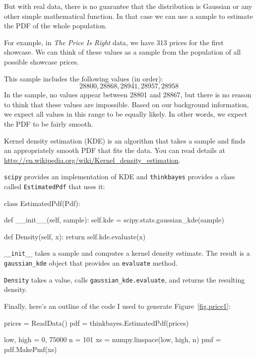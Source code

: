 \documentclass[12pt]{book}
\theoremstyle{exercise}
\begin{document}
But with real data, there is no guarantee that the distribution
is Gaussian or any other simple mathematical function.  In
that case we can use a sample to estimate the PDF of
the whole population.

For example, in {\it The Price Is Right} data, we have
313 prices for the first showcase.  We can think of these
values as a sample from the population of all possible showcase
prices.

This sample includes the following values (in order):
%
\[ 28800, 28868, 28941, 28957, 28958 \]
%
In the sample, no values appear between 28801 and 28867, but
there is no reason to think that these values are impossible.
Based on our background information, we expect all
values in this range to be equally likely.  In other words,
we expect the PDF to be fairly smooth.

Kernel density estimation (KDE) is an algorithm that takes
a sample and finds an appropriately smooth PDF that fits 
the data.  You can read details at
\url{http://en.wikipedia.org/wiki/Kernel_density_estimation}.

{\tt scipy} provides an implementation of KDE and  {\tt thinkbayes}
provides a class called {\tt EstimatedPdf} that 
uses it:

\begin{code}
class EstimatedPdf(Pdf):

    def __init__(self, sample):
        self.kde = scipy.stats.gaussian_kde(sample)

    def Density(self, x):
        return self.kde.evaluate(x)
\end{code}

\verb"__init__" takes a sample
and computes a kernel density estimate.  The result is a
\verb"gaussian_kde" object that provides an {\tt evaluate}
method.

{\tt Density} takes a value, calls \verb"gaussian_kde.evaluate",
and returns the resulting density.

Finally, here's an outline of the code I used to generate
Figure~\ref{fig.price1}:

\begin{code}
    prices = ReadData()
    pdf = thinkbayes.EstimatedPdf(prices)

    low, high = 0, 75000
    n = 101
    xs = numpy.linspace(low, high, n) 
    pmf = pdf.MakePmf(xs)
\end{code}
\end{document}
